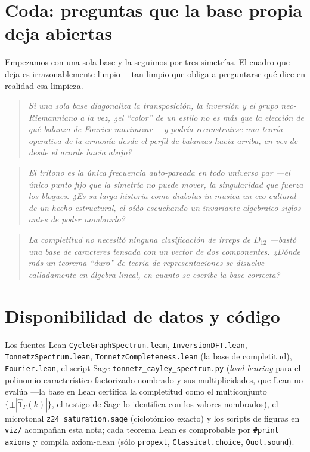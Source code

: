 \documentclass[11pt]{article}
\newcommand{\lean}[1]{\texttt{#1}}
\newcommand{\qlink}[1]{\par\medskip\begin{quote}\itshape\small\color{ctB!88!black}#1\end{quote}\medskip}
\begin{document}
\section*{Coda: preguntas que la base propia deja abiertas}
Empezamos con una sola base y la seguimos por tres simetr\'ias. El cuadro que deja es irrazonablemente
limpio ---tan limpio que obliga a preguntarse qu\'e dice en realidad esa limpieza.

\qlink{Si una sola base diagonaliza la transposici\'on, la inversi\'on \emph{y} el grupo neo-Riemanniano a la
vez, ¿el ``color'' de un estilo no es m\'as que la elecci\'on de qu\'e balanza de Fourier maximizar ---y
podr\'ia reconstruirse una teor\'ia operativa de la armon\'ia desde el perfil de balanzas hacia arriba, en
vez de desde el acorde hacia abajo?}

\qlink{El tritono es la \'unica frecuencia auto-pareada en todo universo par ---el \'unico punto fijo que la
simetr\'ia no puede mover, la singularidad que fuerza los bloques. ¿Es su larga historia como
\emph{diabolus in musica} un eco cultural de un hecho estructural, el o\'ido escuchando un invariante
algebraico siglos antes de poder nombrarlo?}

\qlink{La completitud no necesit\'o ninguna clasificaci\'on de irreps de $D_{12}$ ---bast\'o una base de
caracteres tensada con un vector de dos componentes. ¿D\'onde m\'as un teorema ``duro'' de teor\'ia de
representaciones se disuelve calladamente en \'algebra lineal, en cuanto se escribe la base correcta?}

\section*{Disponibilidad de datos y c\'odigo}
\begin{sloppypar}
Los fuentes Lean \lean{CycleGraphSpectrum.lean}, \lean{InversionDFT.lean}, \lean{TonnetzSpectrum.lean},
\lean{TonnetzCompleteness.lean} (la base de completitud), \lean{Fourier.lean}, el script Sage
\lean{tonnetz\_cayley\_spectrum.py} (\emph{load-bearing} para el polinomio caracter\'istico factorizado
nombrado y sus multiplicidades, que Lean no eval\'ua ---la base en Lean certifica la completitud como el
multiconjunto $\{\pm|\hat{\mathbf 1}_T(k)|\}$, el testigo de Sage lo identifica con los valores nombrados),
el microtonal \lean{z24\_saturation.sage} (ciclot\'omico exacto) y los scripts de figuras en \lean{viz/}
acompa\~nan esta nota; cada teorema Lean es
comprobable por \lean{\#print axioms} y compila axiom-clean (s\'olo \lean{propext}, \lean{Classical.choice},
\lean{Quot.sound}).
\end{sloppypar}
\end{document}
